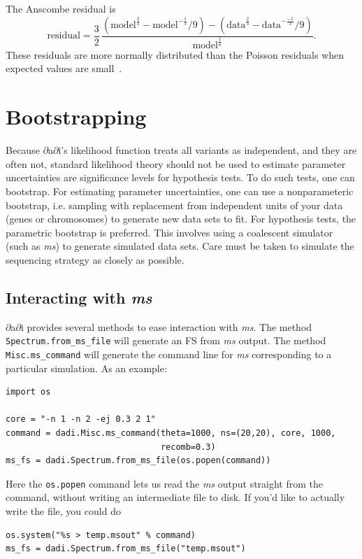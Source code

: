 \documentclass[12pt]{article}
\makeatletter
\newcommand{\dadi}{$\partial$a$\partial$i\xspace}
\newcommand{\ms}{\emph{ms}\xspace}
\newcommand{\py}[1]{\lstinline[language=Python, showstringspaces=False]@#1@}
\makeatother
\begin{document}
The Anscombe residual is
\begin{equation}
\text{residual} = \frac{3}{2} \, \frac{(\text{model}^\frac{2}{3} - \text{model}^{-\frac{1}{3}}/9) - (\text{data}^\frac{2}{3} - \text{data}^{-\frac{-1}{3}}/9)}{\text{model}^\frac{1}{6}}.
\end{equation}
These residuals are more normally distributed than the Poisson residuals when expected values are small~\cite{bib:Pierce1986}.

\section{Bootstrapping}

Because \dadi's likelihood function treats all variants as independent, and they are often not, standard likelihood theory should not be used to estimate parameter uncertainties are significance levels for hypothesis tests.
To do such tests, one can bootstrap.
For estimating parameter uncertainties, one can use a nonparameteric bootstrap, i.e. sampling with replacement from independent units of your data (genes or chromosomes) to generate new data sets to fit.
For hypothesis tests, the parametric bootstrap is preferred.
This involves using a coalescent simulator (such as \ms) to generate simulated data sets.
Care must be taken to simulate the sequencing strategy as closely as possible.

\subsection{Interacting with \ms}

\dadi provides several methods to ease interaction with \ms.
The method \py{Spectrum.from_ms_file} will generate an FS from \ms output.
The method \py{Misc.ms_command} will generate the command line for \ms corresponding to a particular simulation.
As an example:
\begin{lstlisting}
import os

core = "-n 1 -n 2 -ej 0.3 2 1"
command = dadi.Misc.ms_command(theta=1000, ns=(20,20), core, 1000,
                               recomb=0.3)
ms_fs = dadi.Spectrum.from_ms_file(os.popen(command))
\end{lstlisting}
Here the \py{os.popen} command lets us read the \ms output straight from the command, without writing an intermediate file to disk.
If you'd like to actually write the file, you could do
\begin{lstlisting}
os.system("%s > temp.msout" % command)
ms_fs = dadi.Spectrum.from_ms_file("temp.msout")
\end{lstlisting}
\end{document}
